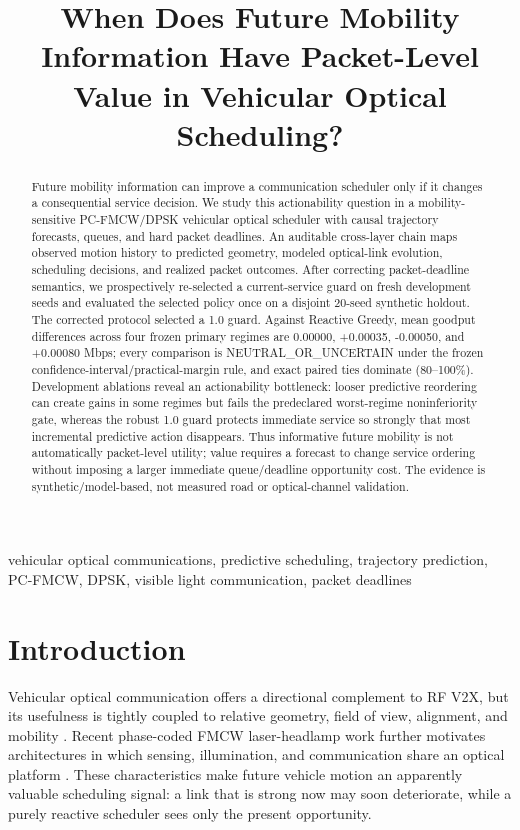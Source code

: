 \documentclass[conference]{IEEEtran}
\title{When Does Future Mobility Information Have Packet-Level Value in Vehicular Optical Scheduling?}
\author{\IEEEauthorblockN{Panagiota Grosdouli}\IEEEauthorblockA{Department of Electrical and Computer Engineering\\School of Engineering\\Democritus University of Thrace\\Xanthi, Greece\\panagros1@ee.duth.gr}}
\begin{document}
\maketitle

\begin{abstract}
Future mobility information can improve a communication scheduler only if it changes a consequential service decision. We study this actionability question in a mobility-sensitive PC-FMCW/DPSK vehicular optical scheduler with causal trajectory forecasts, queues, and hard packet deadlines. An auditable cross-layer chain maps observed motion history to predicted geometry, modeled optical-link evolution, scheduling decisions, and realized packet outcomes. After correcting packet-deadline semantics, we prospectively re-selected a current-service guard on fresh development seeds and evaluated the selected policy once on a disjoint 20-seed synthetic holdout. The corrected protocol selected a 1.0 guard. Against Reactive Greedy, mean goodput differences across four frozen primary regimes are 0.00000, +0.00035, -0.00050, and +0.00080 Mbps; every comparison is NEUTRAL\_OR\_UNCERTAIN under the frozen confidence-interval/practical-margin rule, and exact paired ties dominate (80--100\%). Development ablations reveal an actionability bottleneck: looser predictive reordering can create gains in some regimes but fails the predeclared worst-regime noninferiority gate, whereas the robust 1.0 guard protects immediate service so strongly that most incremental predictive action disappears. Thus informative future mobility is not automatically packet-level utility; value requires a forecast to change service ordering without imposing a larger immediate queue/deadline opportunity cost. The evidence is synthetic/model-based, not measured road or optical-channel validation.
\end{abstract}

\begin{IEEEkeywords}
vehicular optical communications, predictive scheduling, trajectory prediction, PC-FMCW, DPSK, visible light communication, packet deadlines
\end{IEEEkeywords}

\section{Introduction}
Vehicular optical communication offers a directional complement to RF V2X, but its usefulness is tightly coupled to relative geometry, field of view, alignment, and mobility \cite{memedi2021vehicular}. Recent phase-coded FMCW laser-headlamp work further motivates architectures in which sensing, illumination, and communication share an optical platform \cite{liu2026laserheadlamp,kumbul2023smoothed,kumbul2023mimo}. These characteristics make future vehicle motion an apparently valuable scheduling signal: a link that is strong now may soon deteriorate, while a purely reactive scheduler sees only the present opportunity.
\end{document}
